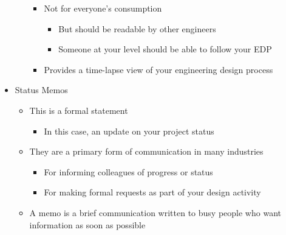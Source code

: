 \begin{itemize}
\begin{itemize}
\begin{itemize}
\begin{itemize}
            \end{itemize}

          \item Not for everyone's consumption

            \begin{itemize}

              \item But should be readable by other engineers

              \item Someone at your level should be able to follow your EDP

            \end{itemize}

          \item Provides a time-lapse view of your engineering design process

        \end{itemize}

    \end{itemize}

  \item Status Memos

    \begin{itemize}

      \item This is a formal statement

        \begin{itemize}

          \item In this case, an update on your project status

        \end{itemize}

      \item They are a primary form of communication in many industries

        \begin{itemize}

          \item For informing colleagues of progress or status

          \item For making formal requests as part of your design activity

        \end{itemize}

      \item A memo is a brief communication written to busy people who want information as soon as possible


\end{itemize}
\end{itemize}
